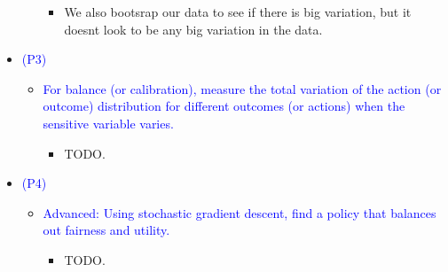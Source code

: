 \begin{itemize}
\begin{itemize}
\begin{itemize}
                \item We also bootsrap our data to see if there is big variation, but it doesnt look to be any big variation in the data.
            \end{itemize}
        \end{itemize}
    \item \textcolor{blue}{(P3)}
        \begin{itemize}
            \item \textcolor{blue}{For balance (or calibration), measure the total variation of the action (or outcome) distribution for different outcomes (or actions) when the sensitive variable varies.}
            \begin{itemize}
                \item TODO.
            \end{itemize}
        \end{itemize}
    \item \textcolor{blue}{(P4)}
        \begin{itemize}
            \item \textcolor{blue}{Advanced: Using stochastic gradient descent, find a policy that balances out fairness and utility.}
            \begin{itemize}
                \item TODO.
            \end{itemize}
        \end{itemize}
\end{itemize}